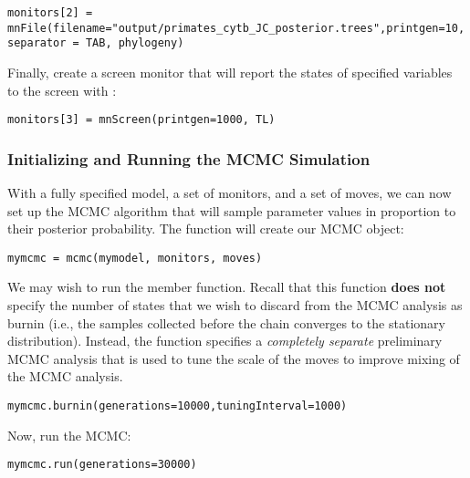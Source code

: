 {\tt \begin{snugshade*}
\begin{lstlisting}
monitors[2] = mnFile(filename="output/primates_cytb_JC_posterior.trees",printgen=10, separator = TAB, phylogeny)
\end{lstlisting}
\end{snugshade*}}


Finally, create a screen monitor that will report the states of specified variables to the screen with :
{\tt \begin{snugshade*}
\begin{lstlisting}
monitors[3] = mnScreen(printgen=1000, TL)
\end{lstlisting}
\end{snugshade*}}

\subsubsection{Initializing and Running the MCMC Simulation}

With a fully specified model, a set of monitors, and a set of moves, we can now set up the MCMC algorithm that will sample parameter values in proportion to their posterior probability. The  function will create our MCMC object:
{\tt \begin{snugshade*}
\begin{lstlisting}
mymcmc = mcmc(mymodel, monitors, moves)
\end{lstlisting}
\end{snugshade*}}


We may wish to run the  member function.
Recall that this function \textbf{does not} specify the number of states that we wish to discard from the MCMC analysis as burnin (i.e., the samples collected before the chain converges to the stationary distribution).  
Instead, the  function specifies a \textit{completely separate} preliminary MCMC analysis that is used to tune the scale of the moves to improve mixing of the MCMC analysis.
{\tt \begin{snugshade*}
\begin{lstlisting}
mymcmc.burnin(generations=10000,tuningInterval=1000)
\end{lstlisting}
\end{snugshade*}}


Now, run the MCMC:
{\tt \begin{snugshade*}
\begin{lstlisting}
mymcmc.run(generations=30000)
\end{lstlisting}
\end{snugshade*}}

